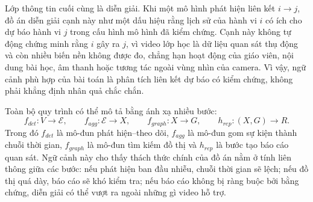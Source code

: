 Lớp thông tin cuối cùng là diễn giải. Khi một mô hình phát hiện liên kết \(i\rightarrow j\), đồ án diễn giải cạnh này như một dấu hiệu rằng lịch sử của hành vi \(i\) có ích cho dự báo hành vi \(j\) trong cấu hình mô hình đã kiểm chứng. Cạnh này không tự động chứng minh rằng \(i\) gây ra \(j\), vì video lớp học là dữ liệu quan sát thụ động và còn nhiều biến nền không được đo, chẳng hạn hoạt động của giáo viên, nội dung bài học, âm thanh hoặc tương tác ngoài vùng nhìn của camera. Vì vậy, ngữ cảnh phù hợp của bài toán là phân tích liên kết dự báo có kiểm chứng, không phải khẳng định nhân quả chắc chắn.

Toàn bộ quy trình có thể mô tả bằng ánh xạ nhiều bước:
\begin{equation}
\label{eq:pipeline-mapping}
    f_{det}: V \rightarrow \mathcal{E}, \qquad
    f_{agg}: \mathcal{E} \rightarrow X, \qquad
    f_{graph}: X \rightarrow G, \qquad
    h_{rep}: (X,G) \rightarrow R.
\end{equation}
Trong đó \(f_{det}\) là mô-đun phát hiện--theo dõi, \(f_{agg}\) là mô-đun gom sự kiện thành chuỗi thời gian, \(f_{graph}\) là mô-đun tìm kiếm đồ thị và \(h_{rep}\) là bước tạo báo cáo quan sát. Ngữ cảnh này cho thấy thách thức chính của đồ án nằm ở tính liên thông giữa các bước: nếu phát hiện ban đầu nhiễu, chuỗi thời gian sẽ lệch; nếu đồ thị quá dày, báo cáo sẽ khó kiểm tra; nếu báo cáo không bị ràng buộc bởi bằng chứng, diễn giải có thể vượt ra ngoài những gì video hỗ trợ.